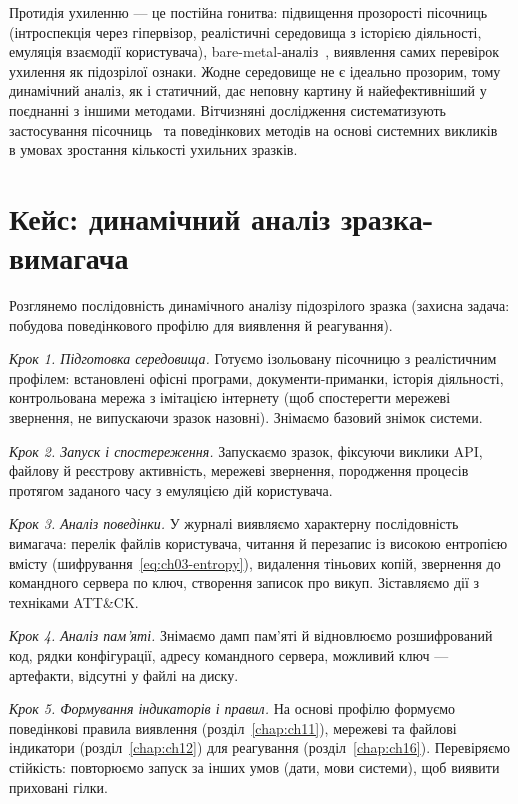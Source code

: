 Протидія ухиленню --- це постійна гонитва: підвищення прозорості пісочниць (інтроспекція через гіпервізор, реалістичні середовища з історією діяльності, емуляція взаємодії користувача), bare-metal-аналіз~\cite{ch07:kirat}, виявлення самих перевірок ухилення як підозрілої ознаки. Жодне середовище не є ідеально прозорим, тому динамічний аналіз, як і статичний, дає неповну картину й найефективніший у поєднанні з іншими методами. Вітчизняні дослідження систематизують застосування пісочниць~\cite{ch07:dynamic-ua} та поведінкових методів на основі системних викликів~\cite{ch07:behavior-ua} в умовах зростання кількості ухильних зразків.

\section{Кейс: динамічний аналіз зразка-вимагача}\label{sec:ch07-case}

Розглянемо послідовність динамічного аналізу підозрілого зразка (захисна задача: побудова поведінкового профілю для виявлення й реагування).

\emph{Крок 1. Підготовка середовища.} Готуємо ізольовану пісочницю з реалістичним профілем: встановлені офісні програми, документи-приманки, історія діяльності, контрольована мережа з імітацією інтернету (щоб спостерегти мережеві звернення, не випускаючи зразок назовні). Знімаємо базовий знімок системи.

\emph{Крок 2. Запуск і спостереження.} Запускаємо зразок, фіксуючи виклики API, файлову й реєстрову активність, мережеві звернення, породження процесів протягом заданого часу з емуляцією дій користувача.

\emph{Крок 3. Аналіз поведінки.} У журналі виявляємо характерну послідовність вимагача: перелік файлів користувача, читання й перезапис із високою ентропією вмісту (шифрування~\eqref{eq:ch03-entropy}), видалення тіньових копій, звернення до командного сервера по ключ, створення записок про викуп. Зіставляємо дії з техніками ATT\&CK.

\emph{Крок 4. Аналіз пам'яті.} Знімаємо дамп пам'яті й відновлюємо розшифрований код, рядки конфігурації, адресу командного сервера, можливий ключ --- артефакти, відсутні у файлі на диску.

\emph{Крок 5. Формування індикаторів і правил.} На основі профілю формуємо поведінкові правила виявлення (розділ~\ref{chap:ch11}), мережеві та файлові індикатори (розділ~\ref{chap:ch12}) для реагування (розділ~\ref{chap:ch16}). Перевіряємо стійкість: повторюємо запуск за інших умов (дати, мови системи), щоб виявити приховані гілки.

